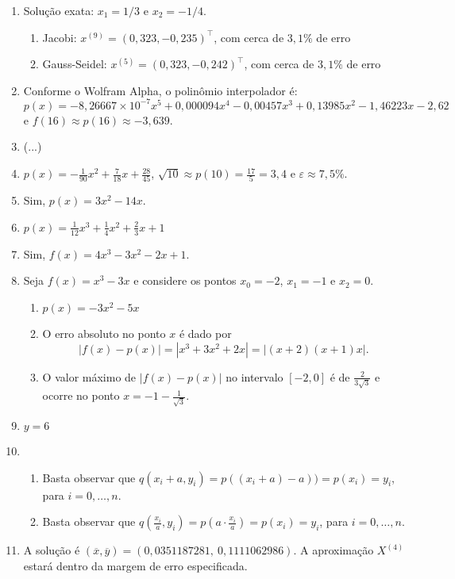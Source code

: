 \documentclass[12pt,a4paper]{article}
\newcommand{\fixme}{{\color{red}(...)}}
\begin{document}
\begin{enumerate}
\item Solução exata: $x_1 = 1/3$ e $x_2 = -1/4$.
\begin{enumerate}
\item Jacobi: $x^{(9)} = (0,323, -0,235)^\intercal$, com cerca de $3,1\%$ de erro
\item Gauss-Seidel: $x^{(5)} = (0,323, -0,242)^\intercal$, com cerca de $3,1\%$ de erro
\end{enumerate}
\item Conforme o Wolfram Alpha, o polinômio interpolador é:
\[
p(x) = -8,\!26667 \times 10^{-7} x^5 + 0,\!000094 x^4 - 0,\!00457 x^3 + 0,\!13985 x^2 - 1,\!46223 x - 2,\!62
\]
e $f(16) \approx p(16) \approx -3,\!639$.
\item \fixme
\item $p(x) = -\frac{1}{90}x^2 + \frac{7}{18} x + \frac{28}{45}$, $\sqrt{10} \approx p(10) = \frac{17}{5} = 3,\!4$ e $\varepsilon \approx 7,\!5\%$.
\item Sim, $p(x) = 3x^2 - 14x$.
\item $p(x) = \frac{1}{12}x^3 + \frac{1}{4}x^2 + \frac{2}{3} x + 1$
\item Sim, $f(x) = 4x^3 - 3x^2 - 2x + 1$.
\item Seja $f(x) = x^3 - 3x$ e considere os pontos $x_0 = -2$, $x_1 = -1$ e $x_2 = 0$.
\begin{enumerate}
\item $p(x) = -3x^2 - 5x$
\item O erro absoluto no ponto $x$ é dado por
\[
|f(x) - p(x)| = |x^3 + 3x^2 + 2x| = |(x + 2) (x + 1) x|.
\]

\item O valor máximo de $|f(x) - p(x)|$ no intervalo $[-2, 0]$ é de $\frac{2}{3 \sqrt{3}}$ e ocorre no ponto $x = -1 - \frac{1}{\sqrt{3}}$.
\end{enumerate}
\item $y=6$
\item
\begin{enumerate}
\item Basta observar que $q(x_i + a, y_i) = p((x_i + a)-a)) = p(x_i) = y_i$, para $i = 0, \ldots, n$.
\item Basta observar que $q(\frac{x_i}{a}, y_i) = p(a \cdot \frac{x_i}{a}) = p(x_i) = y_i$, para $i = 0, \ldots, n$.
\end{enumerate}

\item A solução é $(\overline{x},\overline{y}) = (0,0351187281,\ 0,1111062986)$. A aproximação $X^{(4)}$ estará dentro da margem de erro especificada.
\end{enumerate}
\end{document}
